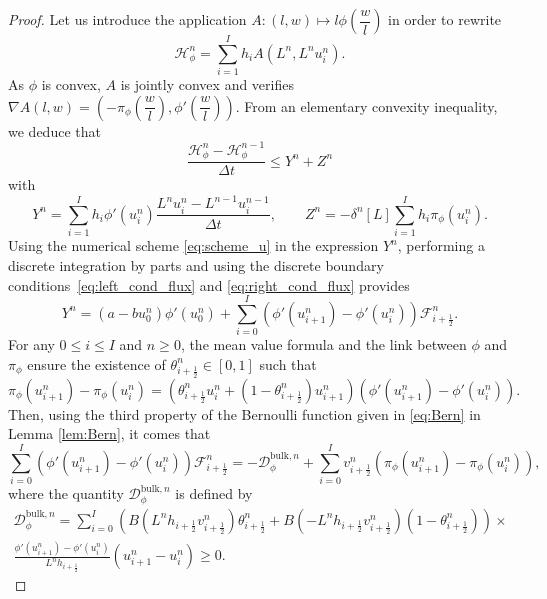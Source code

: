 \documentclass[10pt,a4paper]{amsart}
\newcommand\Bern[3]{B\left(#3 L^n \h{#1}{} \v{#1}{#2}\right)}
\newcommand\Fluxnum[1]{\mathcal{F}_{#1 \frac{1}{2}}^n}
\newcommand\dt{\Delta t}
\newcommand\h[1]{h_{#1 \frac{1}{2}}}
\renewcommand\H{\mathcal{H}_{\phi}}
\renewcommand\v[2]{v_{#1 \frac{1}{2}}^{#2}}
\begin{document}
	\begin{proof}
	Let us introduce the application $A: (l,w) \mapsto l \phi\left(\dfrac{w}{l}\right)$ in order to rewrite 
	$$
	\H^n=\sum_{i=1}^I h_i A\left(L^n, L^n u_i^n \right).
	$$
	As $\phi$ is convex, $A$ is jointly convex and verifies $\nabla A(l,w)=(-\pi_\phi(\dfrac{w}{l}), \phi'(\dfrac{w}{l}))$. 
	From an elementary convexity inequality, we deduce that 
		\begin{equation}\label{disc_energ_dissip_startpt}
			\frac{\H^n - \H^{n-1}}{\dt} \leq Y^n + Z^n
		\end{equation}
		with
		\[
			Y^n = \sum_{i=1}^I h_i \phi'(u_i^n) \frac{L^n u_i^n - L^{n-1} u_i^{n-1}}{\dt}, \qquad 
			Z^n =  -\delta^n[L] \sum_{i=1}^I h_i  \pi_\phi(u_i^n).
		\]
		Using the numerical scheme \eqref{eq:scheme_u} in the expression $Y^n$, performing a discrete integration by parts and using the 
		discrete boundary conditions~\eqref{eq:left_cond_flux} and \eqref{eq:right_cond_flux} provides 
		\begin{equation}\label{def:Yn}
			Y^n  = (a-b u_0^n) \phi'(u_0^n) + \sum_{i=0}^{I} \left( \phi'(u_{i+1}^n) - \phi'(u_{i}^n) \right) \Fluxnum{i+}.
		\end{equation}
		For any $0 \leq i \leq I$ and $n \geq 0$, the mean value formula and the link between $\phi$ and $\pi_\phi$ 
		ensure the existence of $\theta_{i+\frac{1}{2}}^n \in [0,1]$ such that
		\begin{equation} \label{eq:mean_value}
			\pi_\phi(u_{i+1}^n) - \pi_\phi(u_{i}^n) = \left(\theta_{i+\frac{1}{2}}^n u_{i}^n + (1-\theta_{i+\frac{1}{2}}^n)u_{i+1}^n\right) \left(\phi'(u_{i+1}^n) - \phi'(u_{i}^n)\right).
		\end{equation}
	Then, using the third property of the Bernoulli function given in \eqref{eq:Bern} in Lemma \ref{lem:Bern}, it comes that
		\begin{equation} \label{eq:Yn-2}
			\sum_{i=0}^I\left( \phi'(u_{i+1}^n) - \phi'(u_{i}^n) \right) \Fluxnum{i+} =
			- \mathcal{D}_{\phi}^{\text{bulk},n} + \sum_{i=0}^I v_{i + \frac{1}{2}}^n (\pi_\phi(u_{i+1}^n) - \pi_\phi(u_{i}^n)),
		\end{equation}
		where  the quantity $\mathcal{D}_{\phi}^{\text{bulk},n}$ is defined by
		\begin{multline}\label{eq:dbulk.sum}
		\mathcal{D}_{\phi}^{\text{bulk},n} = \sum_{i=0}^{I}
		\left(\Bern{i+}{n}{} \theta_{i+\frac{1}{2}}^n + \Bern{i+}{n}{-}(1 - \theta_{i+\frac{1}{2}}^n) \right)\times  \\
			\frac{\phi'(u_{i+1}^n) - \phi'(u_{i}^n) }{L^n \h{i+}} (u_{i+1}^n - u_{i}^n)  \geq 0.

\end{multline}
\end{proof}
\end{document}
